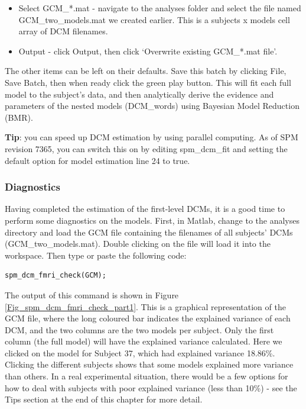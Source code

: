 \documentclass{article}
\begin{document}
\begin{itemize}
    \item Select GCM\_*.mat - navigate to the analyses folder and select the file named GCM\_two\_models.mat we created earlier. This is a subjects x models cell array of DCM filenames.
    \item Output - click Output, then click `Overwrite existing GCM\_*.mat file'.
\end{itemize}

The other items can be left on their defaults. Save this batch by clicking File, Save Batch, then when ready click the green play button. This will fit each full model to the subject's data, and then analytically derive the evidence and parameters of the nested models (DCM\_words) using Bayesian Model Reduction (BMR).

\textbf{Tip}: you can speed up DCM estimation by using parallel computing. As of SPM revision 7365, you can switch this on by editing spm\_dcm\_fit and setting the default option for model estimation line 24 to true.

\subsubsection{Diagnostics} \label{GUI_diagnostics}
Having completed the estimation of the first-level DCMs, it is a good time to perform some diagnostics on the models. First, in Matlab, change to the analyses directory and load the GCM file containing the filenames of all subjects' DCMs (GCM\_two\_models.mat). Double clicking on the file will load it into the workspace. Then type or paste the following code:

\begin{lstlisting}[style=Matlab-editor, caption=DCM for fMRI diagnostics]
spm_dcm_fmri_check(GCM);
\end{lstlisting}

The output of this command is shown in Figure \ref{Fig_spm_dcm_fmri_check_part1}. This is a graphical representation of the GCM file, where the long coloured bar indicates the explained variance of each DCM, and the two columns are the two models per subject. Only the first column (the full model) will have the explained variance calculated. Here we clicked on the model for Subject 37, which had explained variance 18.86\%. Clicking the different subjects shows that some models explained more variance than others. In a real experimental situation, there would be a few options for how to deal with subjects with poor explained variance (less than 10\%) - see the Tips section at the end of this chapter for more detail.
\end{document}
